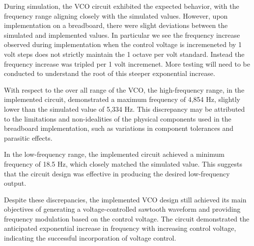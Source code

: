 \documentclass{article}
\begin{document}
During simulation, the VCO circuit exhibited the expected behavior, with the frequency range aligning closely with the simulated values. However, upon implementation on a breadboard, there were slight deviations between the simulated and implemented values. In particular we see the frequency increase observed during implementation when the control voltage is incremeneted by 1 volt steps does not strictly maintain the 1 octave per volt standard. Instead the frequency increase was tripled per 1 volt incremenet. More testing will need to be conducted to understand the root of this steeper exponential increase.

With respect to the over all range of the VCO, the high-frequency range, in the implemented circuit, demonstrated a maximum frequency of 4,854 Hz, slightly lower than the simulated value of 5,334 Hz. This discrepancy may be attributed to the limitations and non-idealities of the physical components used in the breadboard implementation, such as variations in component tolerances and parasitic effects.

In the low-frequency range, the implemented circuit achieved a minimum frequency of 18.5 Hz, which closely matched the simulated value. This suggests that the circuit design was effective in producing the desired low-frequency output.

Despite these discrepancies, the implemented VCO design still achieved its main objectives of generating a voltage-controlled sawtooth waveform and providing frequency modulation based on the control voltage. The circuit demonstrated the anticipated exponential increase in frequency with increasing control voltage, indicating the successful incorporation of voltage control.
\end{document}
